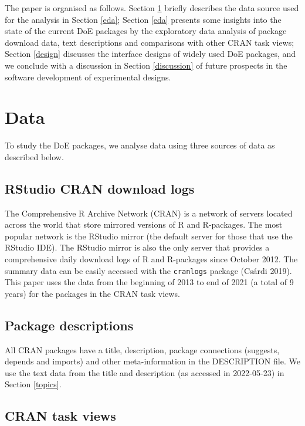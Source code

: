 \documentclass{article}
\begin{document}
The paper is organised as follows. Section \ref{data} briefly describes
the data source used for the analysis in Section \ref{eda}; Section
\ref{eda} presents some insights into the state of the current DoE
packages by the exploratory data analysis of package download data, text
descriptions and comparisons with other CRAN task views; Section
\ref{design} discusses the interface designs of widely used DoE
packages, and we conclude with a discussion in Section \ref{discussion}
of future prospects in the software development of experimental designs.

\hypertarget{data}{%
\section{Data}\label{data}}

To study the DoE packages, we analyse data using three sources of data
as described below.

\hypertarget{rstudio-cran-download-logs}{%
\subsection{RStudio CRAN download
logs}\label{rstudio-cran-download-logs}}

The Comprehensive R Archive Network (CRAN) is a network of servers
located across the world that store mirrored versions of R and
R-packages. The most popular network is the RStudio mirror (the default
server for those that use the RStudio IDE). The RStudio mirror is also
the only server that provides a comprehensive daily download logs of R
and R-packages since October 2012. The summary data can be easily
accessed with the \texttt{cranlogs} package (Csárdi 2019). This paper
uses the data from the beginning of 2013 to end of 2021 (a total of 9
years) for the packages in the CRAN task views.

\hypertarget{package-descriptions}{%
\subsection{Package descriptions}\label{package-descriptions}}

All CRAN packages have a title, description, package connections
(suggests, depends and imports) and other meta-information in the
DESCRIPTION file. We use the text data from the title and description
(as accessed in 2022-05-23) in Section \ref{topics}.

\hypertarget{cran-task-views}{%
\subsection{CRAN task views}\label{cran-task-views}}
\end{document}
